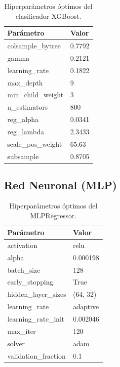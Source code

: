 \documentclass[conference]{IEEEtran}
\begin{document}
    \begin{table}[H]
        \centering
        \caption{Hiperparámetros óptimos del clasificador XGBoost.}
        \label{tab:xgb_classifier}
        \begin{tabular}{ll}
            \toprule
            \textbf{Parámetro} & \textbf{Valor} \\
            \midrule
            colsample\_bytree     & 0.7792 \\
            gamma                 & 0.2121 \\
            learning\_rate        & 0.1822 \\
            max\_depth            & 9 \\
            min\_child\_weight     & 3 \\
            n\_estimators         & 800 \\
            reg\_alpha            & 0.0341 \\
            reg\_lambda           & 2.3433 \\
            scale\_pos\_weight    & 65.63 \\
            subsample             & 0.8705 \\
            \bottomrule
        \end{tabular}
    \end{table}

    \subsection{Red Neuronal (MLP)}

    \begin{table}[H]
        \centering
        \caption{Hiperparámetros óptimos del MLPRegressor.}
        \label{tab:mlp}
        \begin{tabular}{ll}
            \toprule
            \textbf{Parámetro} & \textbf{Valor} \\
            \midrule
            activation            & relu \\
            alpha                 & 0.000198 \\
            batch\_size           & 128 \\
            early\_stopping       & True \\
            hidden\_layer\_sizes  & (64, 32) \\
            learning\_rate        & adaptive \\
            learning\_rate\_init  & 0.002046 \\
            max\_iter             & 120 \\
            solver                & adam \\
            validation\_fraction  & 0.1 \\
            \bottomrule
        \end{tabular}
    \end{table}
\end{document}
